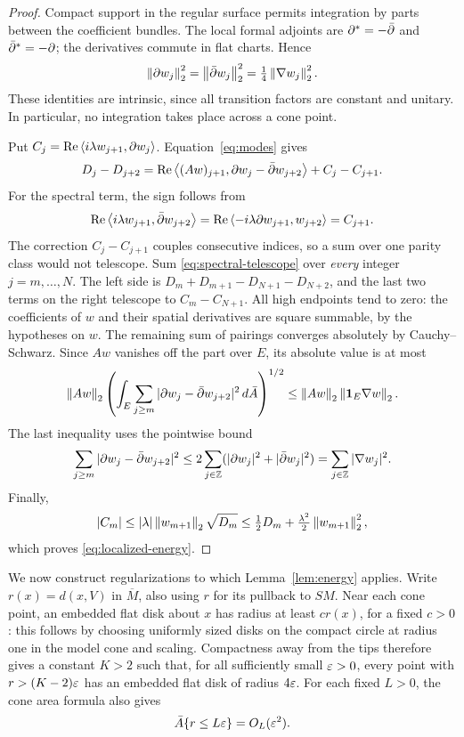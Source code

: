 \begin{proof}
Compact support in the regular surface permits integration by parts
between the coefficient bundles. The local formal adjoints are
\(\partial^*=-\bar\partial\) and \(\bar\partial^*=-\partial\); the derivatives commute in
flat charts. Hence
\begin{equation}\label{eq:complex-energies}
 \left\lVert\partial w_j\right\rVert_2^2=\left\lVert\bar\partial w_j\right\rVert_2^2
                 =\tfrac14\left\lVert\nabla w_j\right\rVert_2^2.
\end{equation}
These identities are intrinsic, since all transition factors are
constant and unitary. In particular, no integration takes place across
a cone point.

Put
\(C_j=\operatorname{Re}\left\langle i\lambda w_{j+1},\partial w_j\right\rangle\).
Equation~\eqref{eq:modes} gives
\begin{equation}\label{eq:spectral-telescope}
 D_j-D_{j+2}
 =\operatorname{Re}\left\langle(Aw)_{j+1},\partial w_j-\bar\partial w_{j+2}\right\rangle
   +C_j-C_{j+1}.
\end{equation}
For the spectral term, the sign follows from
\[
 \operatorname{Re}\left\langle i\lambda w_{j+1},\bar\partial w_{j+2}\right\rangle
 =\operatorname{Re}\left\langle-i\lambda\partial w_{j+1},w_{j+2}\right\rangle
 =C_{j+1}.
\]
The correction \(C_j-C_{j+1}\) couples consecutive indices, so a sum
over one parity class would not telescope. Sum
\eqref{eq:spectral-telescope} over \emph{every} integer
\(j=m,\ldots,N\). The left side is
\(D_m+D_{m+1}-D_{N+1}-D_{N+2}\), and the last two terms on the
right telescope to \(C_m-C_{N+1}\). All high endpoints tend to zero:
the coefficients of \(w\) and their spatial derivatives are square
summable, by the hypotheses on \(w\). The remaining sum of pairings
converges absolutely by Cauchy--Schwarz. Since \(Aw\) vanishes off
the part over \(E\), its absolute value is at most
\[
 \left\lVert Aw\right\rVert_2
 \left(\int_E\sum_{j\ge m}
       |\partial w_j-\bar\partial w_{j+2}|^2\,d\bar A\right)^{1/2}
 \le \left\lVert Aw\right\rVert_2\left\lVert\mathbf 1_E\nabla w\right\rVert_2.
\]
The last inequality uses the pointwise bound
\[
 \sum_{j\ge m}|\partial w_j-\bar\partial w_{j+2}|^2
 \le 2\sum_{j\in\mathbb Z}(|\partial w_j|^2+|\bar\partial w_j|^2)
 =\sum_{j\in\mathbb Z}|\nabla w_j|^2.
\]
Finally,
\[
 |C_m|\le |\lambda|\left\lVert w_{m+1}\right\rVert_2\sqrt{D_m}
 \le \tfrac12D_m+\tfrac{\lambda^2}{2}\left\lVert w_{m+1}\right\rVert_2^2,
\]
which proves \eqref{eq:localized-energy}.
\end{proof}

We now construct regularizations to which Lemma~\ref{lem:energy}
applies. Write \(r(x)=d(x,V)\) in \(\overline M\), also using \(r\)
for its pullback to \(SM\). Near each cone point, an embedded flat
disk about \(x\) has radius at least \(c r(x)\), for a fixed
\(c>0\): this follows by choosing uniformly sized disks on the compact
circle at radius one in the model cone and scaling. Compactness away
from the tips therefore gives a constant \(K>2\) such that, for all
sufficiently small \(\varepsilon>0\), every point with
\(r>(K-2)\varepsilon\) has an embedded flat disk of radius \(4\varepsilon\).
For each fixed \(L>0\), the cone area formula also gives
\begin{equation}\label{eq:cone-area}
 \bar A\{r\le L\varepsilon\}=O_L(\varepsilon^2).
\end{equation}

